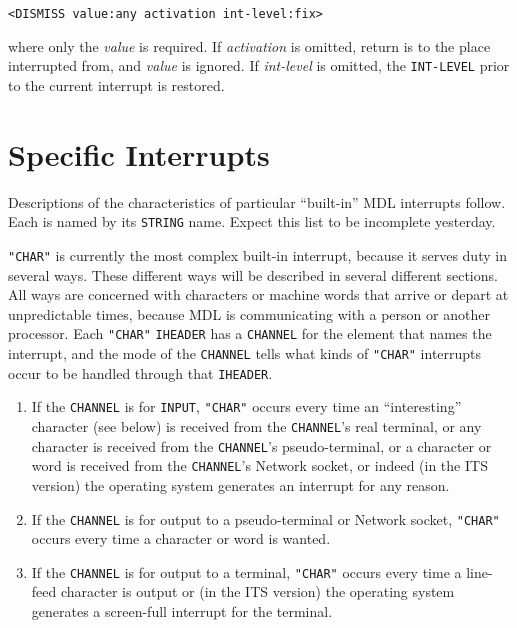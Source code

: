 \documentclass[a4paper]{scrbook}
\providecommand{\tightlist}{%
  \setlength{\itemsep}{0pt}\setlength{\parskip}{0pt}}
\begin{document}
\begin{verbatim}
<DISMISS value:any activation int-level:fix>
\end{verbatim}

where only the \emph{value} is required. If \emph{activation} is omitted, return is to the place interrupted from, and
\emph{value} is ignored. If \emph{int-level} is omitted, the \texttt{INT-LEVEL} prior to the current interrupt is restored.

\section{Specific Interrupts}\label{specific-interrupts}

 Descriptions of the characteristics of particular ``built-in'' MDL interrupts follow. Each
is named by its \texttt{STRING} name. Expect this list to be incomplete yesterday.

\texttt{"CHAR"} is currently the most complex built-in interrupt, because it serves duty in several ways. These different
ways will be described in several different sections. All ways are concerned with characters or machine words that arrive
or depart at unpredictable times, because MDL is communicating with a person or another processor. Each \texttt{"CHAR"}
\texttt{IHEADER} has a \texttt{CHANNEL} for the element that names the interrupt, and the mode of the \texttt{CHANNEL}
tells what kinds of \texttt{"CHAR"} interrupts occur to be handled through that \texttt{IHEADER}.

\begin{enumerate}
\def\labelenumi{\arabic{enumi}.}
\tightlist
\item
  If the \texttt{CHANNEL} is for \texttt{INPUT}, \texttt{"CHAR"} occurs every time an ``interesting'' character (see below)
  is received from the \texttt{CHANNEL}'s real terminal, or any character is received from the \texttt{CHANNEL}'s
  pseudo-terminal, or a character or word is received from the \texttt{CHANNEL}'s Network socket, or indeed (in the
  ITS version) the operating system generates an interrupt for any reason.
\item
  If the \texttt{CHANNEL} is for output to a pseudo-terminal or Network socket, \texttt{"CHAR"} occurs every time a
  character or word is wanted.
\item
  If the \texttt{CHANNEL} is for output to a terminal, \texttt{"CHAR"} occurs every time a line-feed character is output or
  (in the ITS version) the operating system generates a screen-full interrupt for the terminal.
\end{enumerate}
\end{document}
